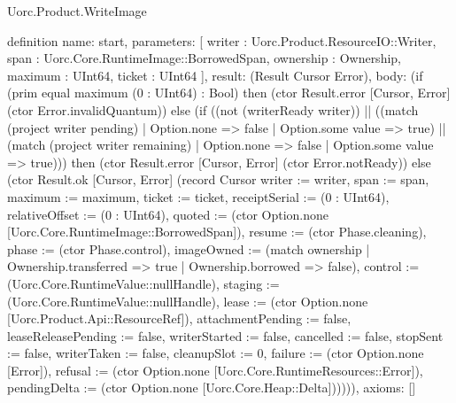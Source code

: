 \begin{lexlean}{Uorc.Product.WriteImage}
\begin{semanticmodule}
definition{
  name: start,
  parameters: [
    writer : Uorc.Product.ResourceIO::Writer,
    span : Uorc.Core.RuntimeImage::BorrowedSpan,
    ownership : Ownership,
    maximum : UInt64,
    ticket : UInt64
  ],
  result: (Result Cursor Error),
  body: (if (prim equal maximum (0 : UInt64) : Bool) then (ctor Result.error [Cursor, Error] (ctor Error.invalidQuantum)) else (if ((not (writerReady writer)) || ((match (project writer pending)
    | Option.none => false
    | Option.some value => true) || (match (project writer remaining)
    | Option.none => false
    | Option.some value => true))) then (ctor Result.error [Cursor, Error] (ctor Error.notReady)) else (ctor Result.ok [Cursor, Error] (record Cursor {writer := writer, span := span, maximum := maximum, ticket := ticket, receiptSerial := (0 : UInt64), relativeOffset := (0 : UInt64), quoted := (ctor Option.none [Uorc.Core.RuntimeImage::BorrowedSpan]), resume := (ctor Phase.cleaning), phase := (ctor Phase.control), imageOwned := (match ownership
    | Ownership.transferred => true
    | Ownership.borrowed => false), control := (Uorc.Core.RuntimeValue::nullHandle), staging := (Uorc.Core.RuntimeValue::nullHandle), lease := (ctor Option.none [Uorc.Product.Api::ResourceRef]), attachmentPending := false, leaseReleasePending := false, writerStarted := false, cancelled := false, stopSent := false, writerTaken := false, cleanupSlot := 0, failure := (ctor Option.none [Error]), refusal := (ctor Option.none [Uorc.Core.RuntimeResources::Error]), pendingDelta := (ctor Option.none [Uorc.Core.Heap::Delta])})))),
  axioms: []
}


\end{semanticmodule}
\end{lexlean}
